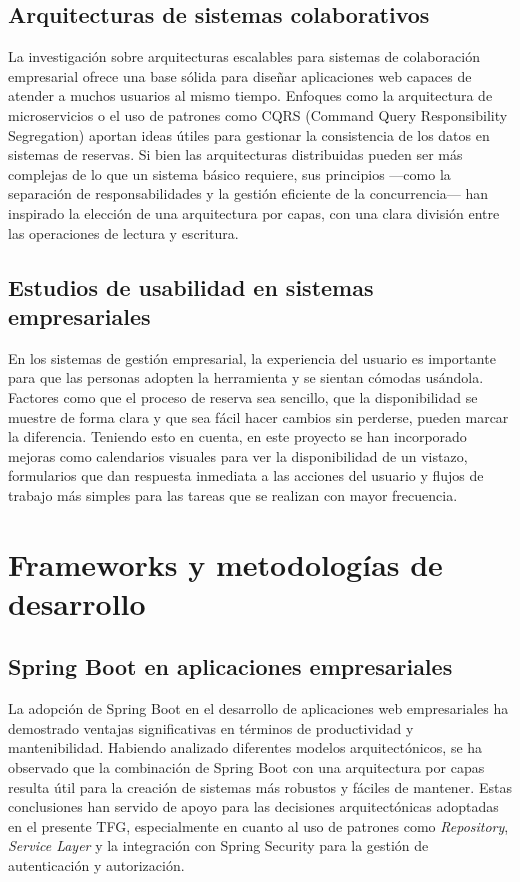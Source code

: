 \subsection{Arquitecturas de sistemas colaborativos}\label{arquitecturas-sistemas-colaborativos}
La investigación sobre arquitecturas escalables para sistemas de colaboración empresarial ofrece una base sólida para diseñar aplicaciones web capaces de atender a muchos usuarios al mismo tiempo. Enfoques como la arquitectura de microservicios o el uso de patrones como CQRS (Command Query Responsibility Segregation) aportan ideas útiles para gestionar la consistencia de los datos en sistemas de reservas.
Si bien las arquitecturas distribuidas pueden ser más complejas de lo que un sistema básico requiere, sus principios —como la separación de responsabilidades y la gestión eficiente de la concurrencia— han inspirado la elección de una arquitectura por capas, con una clara división entre las operaciones de lectura y escritura.

\subsection{Estudios de usabilidad en sistemas empresariales}\label{estudios-usuabilidad-sistemas-empresariales}
En los sistemas de gestión empresarial, la experiencia del usuario es importante para que las personas adopten la herramienta y se sientan cómodas usándola. Factores como que el proceso de reserva sea sencillo, que la disponibilidad se muestre de forma clara y que sea fácil hacer cambios sin perderse, pueden marcar la diferencia.
Teniendo esto en cuenta, en este proyecto se han incorporado mejoras como calendarios visuales para ver la disponibilidad de un vistazo, formularios que dan respuesta inmediata a las acciones del usuario y flujos de trabajo más simples para las tareas que se realizan con mayor frecuencia.

\section{Frameworks y metodologías de desarrollo}\label{frameworks-metodologias-desarrollo}
\subsection{Spring Boot en aplicaciones empresariales}\label{spring-boot-aplicaciones-empresariales}
La adopción de Spring Boot en el desarrollo de aplicaciones web empresariales ha demostrado ventajas significativas en términos de productividad y mantenibilidad. Habiendo analizado diferentes modelos arquitectónicos, se ha observado que la combinación de Spring Boot con una arquitectura por capas resulta útil para la creación de sistemas más robustos y fáciles de mantener. Estas conclusiones han servido de apoyo para las decisiones arquitectónicas adoptadas en el presente TFG, especialmente en cuanto al uso de patrones como \emph{Repository}, \emph{Service Layer} y la integración con Spring Security para la gestión de autenticación y autorización.

